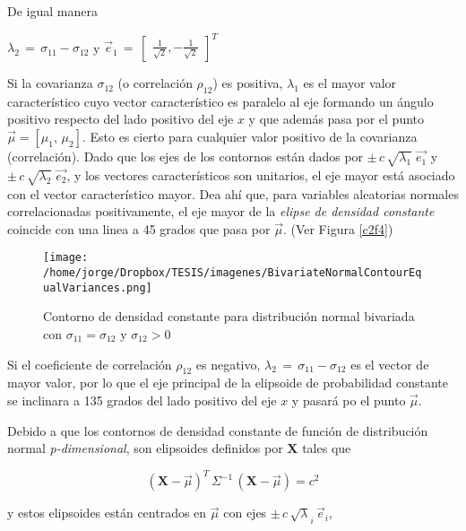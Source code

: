 \documentclass[english]{report}
\begin{document}
De igual manera 

$\lambda_2\,=\,\sigma_{11}-\sigma_{12}$ y $\vec{e}_1\,=\,\begin{bmatrix}
\frac{1}{\sqrt{2}},-\frac{1}{\sqrt{2}}
\end{bmatrix}^T$

Si la covarianza $\sigma_{12}$ (o correlación $\rho_{12}$) es positiva, $\lambda_1$ es el mayor valor característico cuyo vector característico es paralelo al eje formando un ángulo positivo respecto del lado positivo del eje $x$ y que además pasa por el punto $\vec{\mu} = [\mu_1,\,\mu_2]$. Esto es cierto para cualquier valor positivo de la covarianza (correlación). Dado que los ejes de los contornos están dados por $\pm\,c\,\sqrt{\lambda_1}\;\vec{e_1}$ y $\pm\,c\,\sqrt{\lambda_2}\; \vec{e_2}$, y los vectores característicos son unitarios, el eje mayor está asociado con el vector característico mayor.
Dea ahí que, para variables aleatorias normales correlacionadas positivamente, el eje mayor de la \emph{elipse de densidad constante} coincide con una linea a 45 grados que pasa por $\vec{\mu}$. (Ver Figura \ref{c2f4})

\begin{figure}[H]
\centering
\texttt{[image: /home/jorge/Dropbox/TESIS/imagenes/BivariateNormalContourEqualVariances.png]}
\caption{Contorno de densidad constante para distribución normal bivariada con $\sigma_{11}=\sigma_{12}$ y $\sigma_{12} > 0$}
\label{c2f5}
\end{figure}

Si el coeficiente de correlación $\rho_{12}$ es negativo, $\lambda_2\,=\,\sigma_{11}-\sigma_{12}$ es el vector de mayor valor, por lo que el eje principal de la elipsoide de probabilidad constante se inclinara a 135 grados del lado positivo del eje $x$ y pasará po el punto $\vec{\mu}$.

Debido a que los contornos de densidad constante de función de distribución normal \emph{p-dimensional}, son elipsoides definidos por $\textbf{X}$ tales que  

\vspace{5pt}

\begin{equation}
(\textbf{X}-\vec{\mu})^T\,\Sigma^{-1}\,(\textbf{X}-\vec{\mu})=c^2
\label{c2eq16}
\end{equation}


\vspace{5pt}
y estos elipsoides están centrados en $\vec{\mu}$ con ejes $\pm\,c\,\sqrt{\lambda}_i\,\vec{e}_i$,
\end{document}
